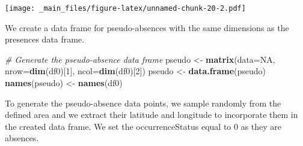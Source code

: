 \documentclass[
]{book}
\newenvironment{Shaded}{\begin{snugshade}}{\end{snugshade}}
\newcommand{\AttributeTok}[1]{\textcolor[rgb]{0.13,0.29,0.53}{#1}}
\newcommand{\CommentTok}[1]{\textcolor[rgb]{0.56,0.35,0.01}{\textit{#1}}}
\newcommand{\ConstantTok}[1]{\textcolor[rgb]{0.56,0.35,0.01}{#1}}
\newcommand{\DecValTok}[1]{\textcolor[rgb]{0.00,0.00,0.81}{#1}}
\newcommand{\FunctionTok}[1]{\textcolor[rgb]{0.13,0.29,0.53}{\textbf{#1}}}
\newcommand{\NormalTok}[1]{#1}
\newcommand{\OtherTok}[1]{\textcolor[rgb]{0.56,0.35,0.01}{#1}}
\newcommand{\SpecialCharTok}[1]{\textcolor[rgb]{0.81,0.36,0.00}{\textbf{#1}}}
\newcommand{\StringTok}[1]{\textcolor[rgb]{0.31,0.60,0.02}{#1}}
\begin{document}
\texttt{[image: \_main\_files/figure-latex/unnamed-chunk-20-2.pdf]}

We create a data frame for pseudo-absences with the same dimensions as the presences data frame.

\begin{Shaded}
\begin{Highlighting}[]
\CommentTok{\# Generate the pseudo{-}absence data frame}
\NormalTok{pseudo }\OtherTok{\textless{}{-}} \FunctionTok{matrix}\NormalTok{(}\AttributeTok{data=}\ConstantTok{NA}\NormalTok{, }\AttributeTok{nrow=}\FunctionTok{dim}\NormalTok{(df0)[}\DecValTok{1}\NormalTok{], }\AttributeTok{ncol=}\FunctionTok{dim}\NormalTok{(df0)[}\DecValTok{2}\NormalTok{])}
\NormalTok{pseudo }\OtherTok{\textless{}{-}} \FunctionTok{data.frame}\NormalTok{(pseudo)}
\FunctionTok{names}\NormalTok{(pseudo) }\OtherTok{\textless{}{-}} \FunctionTok{names}\NormalTok{(df0)}
\end{Highlighting}
\end{Shaded}

To generate the pseudo-absence data points, we sample randomly from the defined area and we extract their latitude and longitude to incorporate them in the created data frame. We set the occurrenceStatus equal to 0 as they are absences.

\begin{Shaded}
\end{Shaded}
\end{document}
